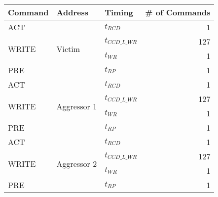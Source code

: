 \begin{table}[!ht]
  \centering
  \footnotesize
  \caption{}
  \begin{tabular}{|l||l|l|r|}
  \hline
  \textbf{Command}                & \textbf{Address}                      & \textbf{Timing}      & \textbf{\# of Commands}                 \\ \hline\hline
  ACT                    & \multirow{4}{*}{Victim}      & $t_{RCD}$        & 1                              \\ \cline{1-1} \cline{3-4} 
  \multirow{2}{*}{WRITE} &                              & $t_{CCD\_L\_WR}$ & 127                            \\ \cline{3-4} 
                         &                              & $t_{WR}$         & 1                              \\ \cline{1-1} \cline{3-4} 
  PRE                    &                              & $t_{RP}$         & 1                              \\ \hline
  ACT                    & \multirow{4}{*}{Aggressor 1} & $t_{RCD}$        & 1                              \\ \cline{1-1} \cline{3-4} 
  \multirow{2}{*}{WRITE} &                              & $t_{CCD\_L\_WR}$ & 127                            \\ \cline{3-4} 
                         &                              & $t_{WR}$         & 1                              \\ \cline{1-1} \cline{3-4} 
  PRE                    &                              & $t_{RP}$         & 1                              \\ \hline
  ACT                    & \multirow{4}{*}{Aggressor 2} & $t_{RCD}$        & 1                              \\ \cline{1-1} \cline{3-4} 
  \multirow{2}{*}{WRITE} &                              & $t_{CCD\_L\_WR}$ & 127                            \\ \cline{3-4} 
                         &                              & $t_{WR}$         & 1                              \\ \cline{1-1} \cline{3-4} 
  PRE                    &                              & $t_{RP}$         & 1                              \\ \hline

\end{tabular}
\end{table}
